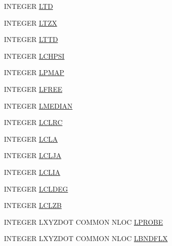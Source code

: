 \begin{DoxyCompactItemize}
I\-N\-T\-E\-G\-E\-R \hyperlink{home_2abonfi_2_c_f_d__codes_2_eul_f_s_83_84_2include_2nloc_8com_a0b1f5dbbdc62804ec5dc66af1e132a37}{L\-T\-D}
\item 
I\-N\-T\-E\-G\-E\-R \hyperlink{home_2abonfi_2_c_f_d__codes_2_eul_f_s_83_84_2include_2nloc_8com_a537c58a1ee889969543d80d603f7a358}{L\-T\-Z\-X}
\item 
I\-N\-T\-E\-G\-E\-R \hyperlink{home_2abonfi_2_c_f_d__codes_2_eul_f_s_83_84_2include_2nloc_8com_a0d4fc998108c0f869ce087a3b54bdca6}{L\-T\-T\-D}
\item 
I\-N\-T\-E\-G\-E\-R \hyperlink{home_2abonfi_2_c_f_d__codes_2_eul_f_s_83_84_2include_2nloc_8com_a8764a03c9a3d37242bf263951a9b72fe}{L\-C\-H\-P\-S\-I}
\item 
I\-N\-T\-E\-G\-E\-R \hyperlink{home_2abonfi_2_c_f_d__codes_2_eul_f_s_83_84_2include_2nloc_8com_aad3707d655f61ee00f44d0ffafa8ad6a}{L\-P\-M\-A\-P}
\item 
I\-N\-T\-E\-G\-E\-R \hyperlink{home_2abonfi_2_c_f_d__codes_2_eul_f_s_83_84_2include_2nloc_8com_ad8866cf17212aeb1747c0d878ce02b6a}{L\-F\-R\-E\-E}
\item 
I\-N\-T\-E\-G\-E\-R \hyperlink{home_2abonfi_2_c_f_d__codes_2_eul_f_s_83_84_2include_2nloc_8com_a8d798cd68d415a92ae547f41860a401f}{L\-M\-E\-D\-I\-A\-N}
\item 
I\-N\-T\-E\-G\-E\-R \hyperlink{home_2abonfi_2_c_f_d__codes_2_eul_f_s_83_84_2include_2nloc_8com_a50c67f35190ba28d966fa34213f34d31}{L\-C\-L\-R\-C}
\item 
I\-N\-T\-E\-G\-E\-R \hyperlink{home_2abonfi_2_c_f_d__codes_2_eul_f_s_83_84_2include_2nloc_8com_a6a7facc1bafbe15e7a64356336cbf970}{L\-C\-L\-A}
\item 
I\-N\-T\-E\-G\-E\-R \hyperlink{home_2abonfi_2_c_f_d__codes_2_eul_f_s_83_84_2include_2nloc_8com_af7aee801d75be31ba1a749e75b742b1f}{L\-C\-L\-J\-A}
\item 
I\-N\-T\-E\-G\-E\-R \hyperlink{home_2abonfi_2_c_f_d__codes_2_eul_f_s_83_84_2include_2nloc_8com_a94e3dae076b855d560e7a19444d9cdb9}{L\-C\-L\-I\-A}
\item 
I\-N\-T\-E\-G\-E\-R \hyperlink{home_2abonfi_2_c_f_d__codes_2_eul_f_s_83_84_2include_2nloc_8com_a63ce6a58e71c59904b91171f31e311f4}{L\-C\-L\-D\-E\-G}
\item 
I\-N\-T\-E\-G\-E\-R \hyperlink{home_2abonfi_2_c_f_d__codes_2_eul_f_s_83_84_2include_2nloc_8com_a28bfbe31dd157ea6cf996d8dc53c016b}{L\-C\-L\-Z\-B}
\item 
I\-N\-T\-E\-G\-E\-R L\-X\-Y\-Z\-D\-O\-T C\-O\-M\-M\-O\-N N\-L\-O\-C \hyperlink{home_2abonfi_2_c_f_d__codes_2_eul_f_s_83_84_2include_2nloc_8com_a8e6118a4515655b3f08c2f37aa4eacda}{L\-P\-R\-O\-B\-E}
\item 
I\-N\-T\-E\-G\-E\-R L\-X\-Y\-Z\-D\-O\-T C\-O\-M\-M\-O\-N N\-L\-O\-C \hyperlink{home_2abonfi_2_c_f_d__codes_2_eul_f_s_83_84_2include_2nloc_8com_a91109db3fe2ba82c0a5d1f145597641b}{L\-B\-N\-D\-F\-L\-X}
\end{DoxyCompactItemize}



